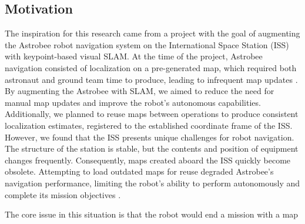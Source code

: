 \subsection{Motivation}


The inspiration for this research came from a project with the goal of augmenting the Astrobee robot navigation system on the International Space Station (ISS) with keypoint-based visual SLAM. At the time of the project, Astrobee navigation consisted of localization on a pre-generated map, which required both astronaut and ground team time to produce, leading to infrequent map updates \cite{soussanAstroLocEfficientRobust2022}. By augmenting the Astrobee with SLAM, we aimed to reduce the need for manual map updates and improve the robot's autonomous capabilities. Additionally, we planned to reuse maps between operations to produce consistent localization estimates, registered to the established coordinate frame of the ISS. However, we found that the ISS presents unique challenges for robot navigation. The structure of the station is stable, but the contents and position of equipment changes frequently. Consequently, maps created aboard the ISS quickly become obsolete. Attempting to load outdated maps for reuse degraded Astrobee's navigation performance, limiting the robot's ability to perform autonomously and complete its mission objectives \cite{zuralesCollaborativeSensingMapping2024}.


The core issue in this situation is that the robot would end a mission with a map

